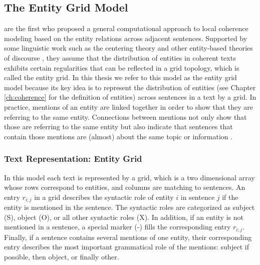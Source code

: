 \subsection{The Entity Grid Model}
\label{sec:rel-ent-grid} 

 are the first who proposed a general  computational approach to local coherence modeling based on the entity relations across adjacent sentences.  
Supported by some linguistic work such as the centering theory \cite{grosz95} and other entity-based theories of discourse \cite{prince81a}, they assume that the distribution of entities in coherent texts exhibits certain regularities that can be reflected in a grid topology, which is called the entity grid. 
In this thesis we refer to this model as the entity grid model because its key idea is to represent the distribution of entities (see Chapter \ref{ch:coherence} for the definition of entities) across sentences in a text by a grid.   
In practice, mentions of an entity are linked together in order to show that they are referring to the same entity. 
Connections between mentions not only show that those are referring to the same entity but also indicate that sentences that contain those mentions are (almost) about the same topic or information \cite{barzilay08}. 

\subsubsection{Text Representation: Entity Grid}

In this model each text is represented by a grid, which is a two dimensional array whose rows correspond to entities, and columns are matching to sentences.
An entry $r_{i;j}$ in a grid describes the syntactic role of entity $i$ in sentence $j$ if the entity is mentioned in the sentence. 
The syntactic roles are categorized as subject (S), object (O), or all other syntactic roles (X). 
In addition, if an entity is not mentioned in a sentence, a special marker (-) fills the corresponding entry $r_{i;j}$. 
Finally, if a sentence contains several mentions of one entity, their corresponding entry describes the most important grammatical role of the mentions: subject if possible, then object, or finally other. 

